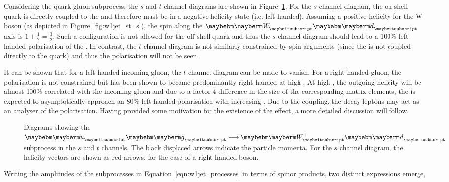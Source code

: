 Considering the quark-gluon subprocess, the $s$ and $t$ channel diagrams are
shown in Figure~\ref{fig:w1jet_st}. For the $s$ channel diagram, the on-shell
\Pdown quark is directly coupled to the \PW and therefore must be in a negative
helicity state (i.e. left-handed). Assuming a positive helicity for the W boson
(as depicted in Figure~\ref{fig:w1jet_st_s}), the spin along the $\PW\Pdown$
axis is $1+\frac{1}{2} = \frac{3}{2}$. Such a configuration is not allowed for the
\spinhalf off-shell quark and thus the $s$-channel diagram should lead to a 100\%
left-handed polarisation of the \PW. In contrast, the $t$ channel diagram is not
similarly constrained by spin arguments (since the \PW is not coupled directly
to the quark) and thus the polarisation will not be seen.

It can be shown that for a left-handed incoming gluon, the $t$-channel diagram
can be made to vanish. For a right-handed gluon, the \PW polarisation is not
constrained but has been shown to become predominantly right-handed at high
\PtW. At high \PtW, the outgoing \PW helicity will be almost 100\% correlated
with the incoming gluon and due to a factor 4 difference in the size of the
corresponding matrix elements, the \PW is expected to asymptotically approach an
80\% left-handed polarisation with increasing \PtW. Due to the \VminusA
coupling, the decay leptons may act as an analyser of the \PW
polarisation. Having provided some motivation for the existence of the effect, a
more detailed discussion will follow.

\begin{figure}
\centering
{}\quad
{}
\caption{Diagrams showing the $\Pup\Pgluon\longrightarrow\PWp\Pdown$ subprocess
  in the  $s$ and  $t$ channels. The black displaced arrows indicate the particle
  momenta. For the $s$ channel diagram, the helicity vectors are shown as red
  arrows, for the case of a right-handed \PW boson.}
\label{fig:w1jet_st}
\end{figure}

Writing the amplitudes of the subprocesses in Equation~\ref{eqn:w1jet_processes}
in terms of spinor products, two distinct expressions emerge,

